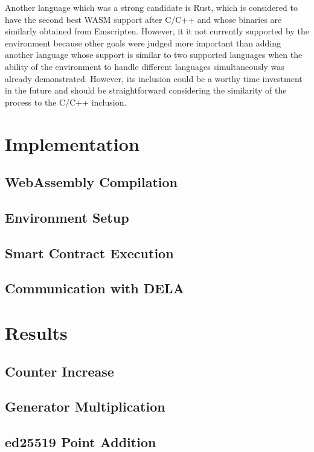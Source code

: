 \documentclass[11pt, a4paper, twoside, openright]{article}
\begin{document}
Another language which was a strong candidate is Rust, which is considered to have the second best WASM support after C/C++ and whose binaries are similarly obtained from Emscripten. However, it it not currently supported by the environment because other goals were judged more important than adding another language whose support is similar to two supported languages when the ability of the environment to handle different languages simultaneously was already demonstrated. However, its inclusion could be a worthy time investment in the future and should be straightforward considering the similarity of the process to the C/C++ inclusion.


\section{Implementation}

\subsection{WebAssembly Compilation}

\subsection{Environment Setup}

\subsection{Smart Contract Execution}

\subsection{Communication with DELA}


\section{Results}

\subsection{Counter Increase}

\subsection{Generator Multiplication}

\subsection{ed25519 Point Addition}
\end{document}
